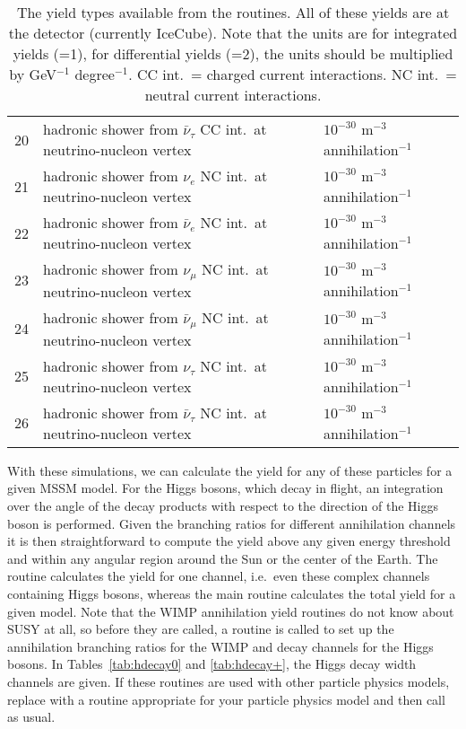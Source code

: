 \begin{table}
\begin{tabular}{lll}
20 & hadronic shower from $\bar{\nu}_\tau$ CC int.\ at neutrino-nucleon vertex & $10^{-30}$ m$^{-3}$ annihilation$^{-1}$ \\
21 & hadronic shower from $\nu_e$ NC int.\ at neutrino-nucleon vertex & $10^{-30}$ m$^{-3}$ annihilation$^{-1}$ \\
22 & hadronic shower from $\bar{\nu}_e$ NC int.\ at neutrino-nucleon vertex & $10^{-30}$ m$^{-3}$ annihilation$^{-1}$ \\
23 & hadronic shower from $\nu_\mu$ NC int.\ at neutrino-nucleon vertex & $10^{-30}$ m$^{-3}$ annihilation$^{-1}$ \\
24 & hadronic shower from $\bar{\nu}_\mu$ NC int.\ at neutrino-nucleon vertex & $10^{-30}$ m$^{-3}$ annihilation$^{-1}$ \\
25 & hadronic shower from $\nu_\tau$ NC int.\ at neutrino-nucleon vertex & $10^{-30}$ m$^{-3}$ annihilation$^{-1}$ \\
26 & hadronic shower from $\bar{\nu}_\tau$ NC int.\ at neutrino-nucleon vertex & $10^{-30}$ m$^{-3}$ annihilation$^{-1}$ \\
\end{tabular}
\caption{The yield types available from the  routines. All of these yields are at the detector (currently IceCube). Note that the units are for integrated yields (=1), for differential
yields (=2), the units should be multiplied by GeV$^{-1}$ degree$^{-1}$.
CC int.\ = charged current interactions. NC int.\ = neutral current interactions.
\label{tab:wa-types}}
\end{table}

With these simulations, we can calculate the yield for any of these
particles for a given MSSM model.  For the Higgs bosons, which decay
in flight, an integration over the angle of the decay products with
respect to the direction of the Higgs boson is performed.  Given the
branching ratios for different annihilation channels it is then
straightforward to compute the yield above any given energy
threshold and within any angular region around the Sun or the center
of the Earth. The routine  calculates the yield for one channel, i.e.\ even these complex channels containing Higgs bosons, whereas the main routine  calculates the total
yield for a given model. Note that the WIMP annihilation yield routines do not know about SUSY at all, so before they are called, a routine  is called to set up the annihilation branching ratios for the WIMP and decay channels for the Higgs bosons. In Tables~\ref{tab:hdecay0} and \ref{tab:hdecay+}, the Higgs decay width channels are given.
 If these routines are used with other particle physics models, replace  with a routine appropriate for your particle physics model and then call  as usual.

